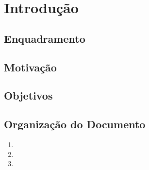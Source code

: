\chapter{Introdução}
\label{chap:intro}

\section{Enquadramento}
\label{sec:amb} 

\section{Motivação}
\label{sec:mot}


\section{Objetivos}
\label{sec:obj}

\section{Organização do Documento}
\label{sec:organ}
\begin{enumerate}
\item 
\item 
\item 
\end{enumerate}
